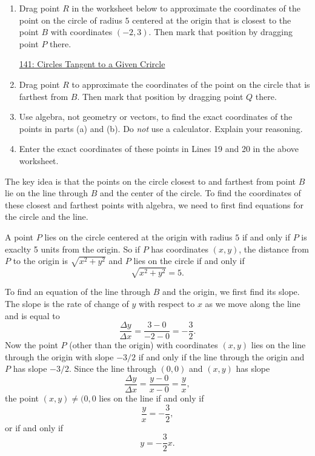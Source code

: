 \documentclass{ximera}
\begin{document}
\begin{question}  \label{QKdf49edr4333}
\begin{enumerate}

\item Drag point $R$ in the worksheet below to approximate the coordinates of the point on the circle of radius $5$ centered at the origin that is closest to the point $B$ with coordinates $(-2,3)$. Then mark that position by dragging point $P$ there.

\begin{onlineOnly}
    \begin{center}
\end{center}
\end{onlineOnly}

\href{https://www.desmos.com/calculator/6yotul255q}{141: Circles Tangent to a Given Crircle}

\item Drag point $R$ to approximate the coordinates of the point on the circle that is farthest from $B$. Then mark that position by dragging point $Q$ there.

\item Use algebra, not geometry or vectors, to find the exact coordinates of the points in parts (a) and (b). Do \emph{not} use a calculator. Explain your reasoning.

\item Enter the exact coordinates of these points in Lines 19 and 20 in the above worksheet.

\end{enumerate}

\begin{explanation}
The key idea is that the points on the circle closest to and farthest from point $B$ lie on the line through $B$ and the center of the circle. To find the coordinates of these closest and farthest points with algebra, we need to first find equations for the circle and the line.

A point $P$ lies on the circle centered at the origin with radius $5$ if and only if $P$ is exaclty 5 units from the origin. So if $P$ has coordinates $(x,y)$, the distance from $P$ to the origin is $\sqrt{x^2+y^2}$ and $P$ lies on the circle if and only if
\[
     \sqrt{x^2 + y^2} = 5.
\]

To find an equation of the line through $B$ and the origin, we first find its slope. The slope is the rate of change of $y$ with respect to $x$ as we move along the line and is equal to 
\[
  \frac{\Delta y}{\Delta x} = \frac{3 - 0}{-2 - 0} = - \frac{3}{2}.
\]
Now the point $P$ (other than the origin) with coordinates $(x,y)$ lies on the line through the origin with slope $-3/2$ if and only if the line through the origin and $P$ has slope $-3/2$. Since the line through $(0,0)$ and $(x,y)$ has slope
\[
 \frac{\Delta y}{\Delta x} = \frac{y - 0}{x - 0} = \frac{y}{x},
\]
the point $(x,y)\neq (0,0$ lies on the line if and only if
\[
    \frac{y}{x} = -\frac{3}{2},
\]
or if and only if 
\[
 y = -\frac{3}{2}x.
\]


\end{explanation}
\end{question}
\end{document}
